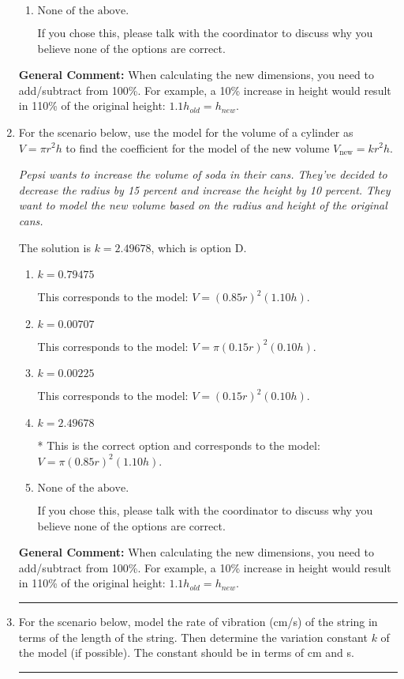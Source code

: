 \documentclass{extbook}[14pt]
\newcommand{\litem}[1]{\item #1

\rule{\textwidth}{0.4pt}}
\begin{document}
\begin{enumerate}
{\begin{enumerate}[label=\Alph*.]
This corresponds to the model: $V = (1.18 r)^2 (0.83 h)$.
\item \( \text{None of the above.} \)

If you chose this, please talk with the coordinator to discuss why you believe none of the options are correct.
\end{enumerate}

\textbf{General Comment:} When calculating the new dimensions, you need to add/subtract from 100\%. For example, a 10\% increase in height would result in 110\% of the original height: $1.1h_{old} = h_{new}$.
}
\litem{
For the scenario below, use the model for the volume of a cylinder as $V = \pi r^2 h$ to find the coefficient for the model of the new volume $V_{\text{new}} = k r^2 h$.

\begin{center}
    \textit{ Pepsi wants to increase the volume of soda in their cans. They've decided to decrease the radius by 15 percent and increase the height by 10 percent. They want to model the new volume based on the radius and height of the original cans. }
\end{center}
The solution is \( k = 2.49678 \), which is option D.\begin{enumerate}[label=\Alph*.]
\item \( k = 0.79475 \)

This corresponds to the model: $V = (0.85 r)^2 (1.10 h)$.
\item \( k = 0.00707 \)

This corresponds to the model: $V = \pi (0.15 r)^2 (0.10 h)$.
\item \( k = 0.00225 \)

This corresponds to the model: $V = (0.15 r)^2 (0.10 h)$.
\item \( k = 2.49678 \)

* This is the correct option and corresponds to the model: $V = \pi (0.85 r)^2 (1.10 h)$.
\item \( \text{None of the above.} \)

If you chose this, please talk with the coordinator to discuss why you believe none of the options are correct.
\end{enumerate}

\textbf{General Comment:} When calculating the new dimensions, you need to add/subtract from 100\%. For example, a 10\% increase in height would result in 110\% of the original height: $1.1h_{old} = h_{new}$.
}
\litem{
For the scenario below, model the rate of vibration (cm/s) of the string in terms of the length of the string. Then determine the variation constant $k$ of the model (if possible). The constant should be in terms of cm and s.

}
\end{enumerate}
\end{document}
